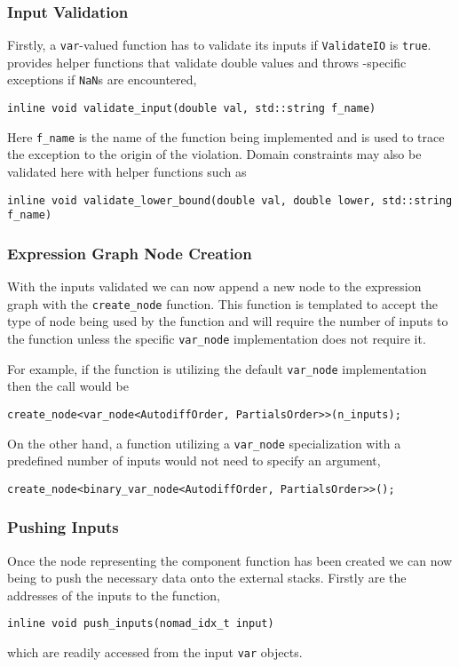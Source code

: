 \subsubsection{Input Validation}

Firstly, a \verb|var|-valued function has to validate its inputs if
\verb|ValidateIO| is \verb|true|.  \nomad provides helper functions
that validate double values and throws \nomad-specific exceptions
if \verb|NaN|s are encountered,
%
\begin{verbatim}
inline void validate_input(double val, std::string f_name)
\end{verbatim}
%
Here \verb|f_name| is the name of the function being implemented
and is used to trace the exception to the origin of the violation.
Domain constraints may also be validated here with helper functions
such as
%
\begin{verbatim}
inline void validate_lower_bound(double val, double lower, std::string f_name)
\end{verbatim}

\subsubsection{Expression Graph Node Creation}

With the inputs validated we can now append a new node to the
expression graph with the \verb|create_node| function.  This function
is templated to accept the type of node being used by the function
and will require the number of inputs to the function unless the
specific \verb|var_node| implementation does not require it.

For example, if the function is utilizing the default \verb|var_node|
implementation then the call would be
%
\begin{verbatim}
create_node<var_node<AutodiffOrder, PartialsOrder>>(n_inputs);
\end{verbatim}
%
On the other hand, a function utilizing a \verb|var_node| specialization
with a predefined number of inputs would not need to specify an
argument,
%
\begin{verbatim}
create_node<binary_var_node<AutodiffOrder, PartialsOrder>>();
\end{verbatim}

\subsubsection{Pushing Inputs}

Once the node representing the component function has been created
we can now being to push the necessary data onto the external stacks.
Firstly are the addresses of the inputs to the function,
%
\begin{verbatim}
inline void push_inputs(nomad_idx_t input)
\end{verbatim}
%
which are readily accessed from the input \verb|var| objects.

